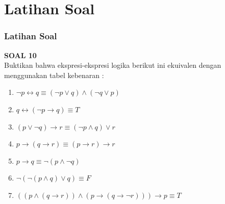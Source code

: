 \documentclass[handout]{beamer}
\theoremstyle{definition}
\theoremstyle{example}
\begin{document}
\section{Latihan Soal}
\begin{frame}
	\frametitle{Latihan Soal}
	\textbf{SOAL 10}\\
	Buktikan bahwa ekspresi-ekspresi logika berikut ini ekuivalen dengan menggunakan tabel kebenaran :\\
	\begin{enumerate}
		\item $ \neg p \leftrightarrow q  \equiv (\neg p \vee q)\wedge (\neg q \vee p) $
		\item $q \leftrightarrow (\neg p \rightarrow q) \equiv T$
		\item $(p \vee \neg q)\rightarrow r \equiv (\neg p \wedge q)\vee r$	
		\item $p \rightarrow (q \rightarrow r) \equiv (p \rightarrow r)\rightarrow r$
		\item $p \rightarrow q \equiv \neg (p \wedge \neg q) $
		\item $\neg (\neg(p \wedge q)\vee q) \equiv F$
		\item $ ((p \wedge (q\rightarrow r))\wedge(p \rightarrow(q \rightarrow \neg r)))\rightarrow p \equiv T$	
	\end{enumerate}	
\end{frame}
\end{document}
